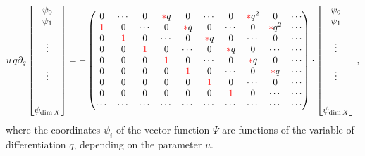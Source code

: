 \documentclass[twoside,leqno]{article}
\numberwithin{equation}{section}
\theoremstyle{plain}
\theoremstyle{definition}
\begin{document}
\begin{equation} \label{eq:secondhorizontality}
u\,q \partial_q\begin{bmatrix}\psi_0 \\ \psi_1 \\ \\ \vdots \\ \\ \vdots \\ \\ \\ \psi_{\dim X}\end{bmatrix}= - 
\begin{pmatrix} 0 & \cdots & 0 &{\color{red}{*}} q & 0 & \cdots &  0 & {\color{red}{*}} q^2& 0 & \cdots \\
\color{red}{1} & 0 & \cdots & 0 & {\color{red}{*}} q & 0 & \cdots &  0 & {\color{red}{*}} q^2 & \cdots  \\
0 & \color{red}{1} & 0 & \cdots &  0 & {\color{red}{*}} q & 0 & \cdots & 0  & \cdots \\
0 & 0 & \color{red}{1} & 0 & \cdots & 0 & {\color{red}{*}} q & 0 & \cdots & \cdots \\
0 & 0 & 0 & \color{red}{1} & 0 & \cdots & 0 & {\color{red}{*}} q & 0  & \cdots \\
0 & 0 & 0 & 0 & \color{red}{1} & 0 & \cdots & 0 & {\color{red}{*}} q & \cdots \\
0 & 0 & 0 & 0 & 0 & \color{red}{1} & 0 & \cdots & 0 & \cdots \\ 
0 & 0 & 0 & 0 & 0 & 0 & \color{red}{1} & 0 & \cdots & \cdots\\ 
\cdots & \cdots & \cdots & \cdots & \cdots & \cdots & \cdots & \cdots & \cdots & \cdots
\end{pmatrix}\cdot 
\begin{bmatrix}\psi_0 \\ \psi_1 \\ \\ \vdots \\ \\ \vdots \\ \\ \\ \psi_{\dim X}\end{bmatrix},
\end{equation}
where the coordinates $\psi_{i}$ of the vector function $\Psi$ are functions of the variable of differentiation $q$,  depending on the parameter $u$. 
\end{document}
